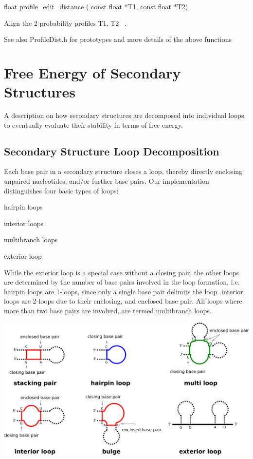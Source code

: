\begin{DoxyVerb}float profile_edit_distance ( const float *T1,
                              const float *T2)
\end{DoxyVerb}
 Align the 2 probability profiles T1, T2~\newline
.

\begin{DoxySeeAlso}{See also}
Profile\+Dist.\+h for prototypes and more details of the above functions 
\end{DoxySeeAlso}
\hypertarget{energy_evaluation}{}\section{Free Energy of Secondary Structures}\label{energy_evaluation}
A description on how secondary structures are decomposed into individual loops to eventually evaluate their stability in terms of free energy.\hypertarget{energy_evaluation_sec_loop_decomposition}{}\subsection{Secondary Structure Loop Decomposition}\label{energy_evaluation_sec_loop_decomposition}
Each base pair in a secondary structure closes a loop, thereby directly enclosing unpaired nucleotides, and/or further base pairs. Our implementation distinguishes four basic types of loops\+:


\begin{DoxyItemize}
\item hairpin loops
\item interior loops
\item multibranch loops
\item exterior loop
\end{DoxyItemize}

While the exterior loop is a special case without a closing pair, the other loops are determined by the number of base pairs involved in the loop formation, i.\+e. hairpin loops are 1-\/loops, since only a single base pair delimits the loop. interior loops are 2-\/loops due to their enclosing, and enclosed base pair. All loops where more than two base pairs are involved, are termed multibranch loops.

 
\begin{DoxyImageNoCaption}
  \mbox{\includegraphics[width=\textwidth,height=\textheight/2,keepaspectratio=true]{loop_types}}
\end{DoxyImageNoCaption}


